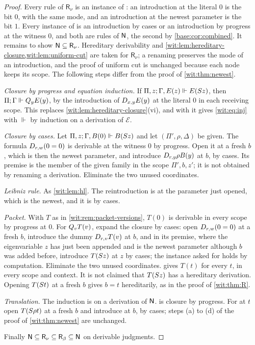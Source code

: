 \begin{proof}
Every rule of $\mathsf{R}_{\nu}$ is an instance of : an
introduction at the literal $0$ is the bit $0$, with the same mode, and an
introduction at the newest parameter is the bit $1$.  Every instance of
 is an introduction by cases or an introduction by progress
at the witness $0$, and both are rules of $\mathsf{N}$, the second by
\cref{base:cor:combined}.  It remains to show
$\mathsf{N}\subseteq\mathsf{R}_{\nu}$.
Hereditary derivability and
\cref{wit:lem:hereditary-closure,wit:lem:uniform-cut} are taken for
$\mathsf{R}_{\nu}$; a renaming preserves the mode of an introduction, and
the proof of uniform cut is unchanged because each node keeps its scope.
The following steps differ from the proof of \cref{wit:thm:newest}.

\emph{Closure by progress and equation induction.}  If
$\Pi,z;\Gamma,E(z)\Vdash E(S z)$, then $\Pi;\Gamma\Vdash Q_{y}E(y)$, by
the introduction of $D_{x,y}E(y)$ at the literal $0$ in each receiving
scope.  This replaces \cref{wit:lem:hereditary-closure}(vi), and with
 it gives \eqref{wit:eq:inj} with $\Vdash$ by induction on a
derivation of $\mathcal E$.

\emph{Closure by cases.}  Let $\Pi,z;\Gamma,B(0)\Vdash B(S z)$ and let
$(\Pi',\rho,\Delta)$ be given.  The formula $D_{r,w}(0=0)$ is derivable at
the witness $0$ by progress.  Open it at a fresh $b$, which is then the
newest parameter, and introduce $D_{r,y}\rho B(y)$ at $b$, by cases.  Its
premise is the member of the given family in the scope $\Pi',b,z'$; it is
not obtained by renaming a derivation.  Eliminate the two unused
coordinates.

\emph{Leibniz rule.}  As \cref{wit:lem:hl}.  The reintroduction is at the
parameter just opened, which is the newest, and it is by cases.

\emph{Packet.}  With $T$ as in \cref{wit:rem:packet-versions}, $T(0)$ is
derivable in every scope by progress at $0$.  For $Q_{v}T(v)$, expand the
closure by cases: open $D_{r,w}(0=0)$ at a fresh $b$, introduce the dummy
$D_{r,v}T(v)$ at $b$, and in its premise, where the eigenvariable $z$ has
just been appended and is the newest parameter although $b$ was added
before, introduce $T(S z)$ at $z$ by cases; the instance asked for holds
by computation.  Eliminate the two unused coordinates.   gives
$T(t)$ for every $t$, in every scope and context.  It is not claimed that
$T(S z)$ has a hereditary derivation.  Opening $T(S t)$ at a fresh
$b$ gives $b=t$ hereditarily, as in the proof of \cref{wit:thm:R}.

\emph{Translation.}  The induction is on a derivation of $\mathsf{N}$.
 is closure by progress.  For  at $t$ open
$T(S\rho t)$ at a fresh $b$ and introduce at $b$, by cases; steps (a) to
(d) of the proof of \cref{wit:thm:newest} are unchanged.

Finally $\mathsf{N}\subseteq\mathsf{R}_{\nu}\subseteq\mathsf{R}_{\beta}\subseteq
\mathsf{N}$ on derivable judgments.
\end{proof}


